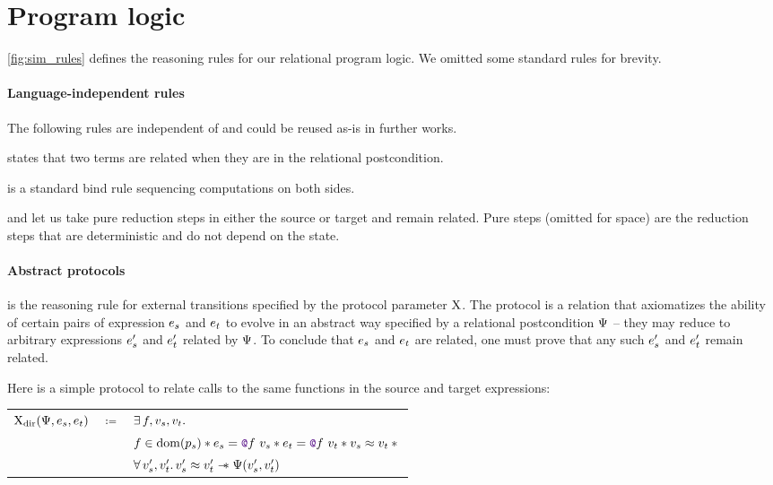 \section{Program logic}

\cref{fig:sim_rules} defines the reasoning rules for our relational program logic. We omitted some standard rules for brevity.

\paragraph{Language-independent rules} The following rules are
independent of \DataLang and could be reused as-is in further works.

 states that two terms are related when they are in the relational postcondition.

 is a standard bind rule sequencing computations on both sides.

 and  let us take pure reduction steps in either the source or target and remain related. Pure steps (omitted for space) are the reduction steps that are deterministic and do not depend on the state.

\paragraph{Abstract protocols}
 is the reasoning rule for external transitions specified by the protocol parameter $\mathrm{X}$. The protocol is a relation that axiomatizes the ability of certain pairs of expression $\datalangExpr_s$ and $\datalangExpr_t$ to evolve in an abstract way specified by a relational postcondition $\Psi$ -- they may reduce to arbitrary expressions $\datalangExpr_s'$ and $\datalangExpr_t'$ related by $\Psi$. To conclude that $\datalangExpr_s$ and $\datalangExpr_t$ are related, one must prove that any such $\datalangExpr_s'$ and $\datalangExpr_t'$ remain related.

Here is a simple protocol to relate calls to the same functions in the source and target expressions:

\begin{center}
\begin{tabular}{rcl}
        $\iProt_\mathrm{dir} (\iPredTwo, \datalangExpr_s, \datalangExpr_t)$
        & $\coloneqq$ &
        $\exists \datalangFn, \datalangVal_s, \datalangVal_t \ldotp$
    \\
        &&
        $\datalangFn \in \dom{\datalangProg_s} \iSep
        \datalangExpr_s = \datalangCall{\datalangFnptr{\datalangFn}}{\datalangVal_s} \iSep
        \datalangExpr_t = \datalangCall{\datalangFnptr{\datalangFn}}{\datalangVal_t} \iSep
        \datalangVal_s \iSimilar \datalangVal_t \iSep {}$
    \\
        &&
        $\forall \datalangVal_s', \datalangVal_t' \ldotp
        \datalangVal_s' \iSimilar \datalangVal_t' \iSepImp
        \iPredTwo (\datalangVal_s', \datalangVal_t')$
\end{tabular}
\end{center}

